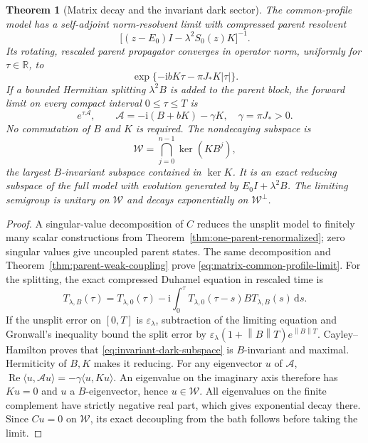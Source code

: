 \documentclass[11pt,a4paper,oneside]{book}
\theoremstyle{plain}
\newtheorem{theorem}{Theorem}[chapter]
\theoremstyle{definition}
\theoremstyle{remark}
\newcommand{\R}{\mathbb R}
\newcommand{\dd}{\mathrm d}
\newcommand{\ii}{\mathrm i}
\newcommand{\norm}[1]{\left\lVert#1\right\rVert}
\newcommand{\src}[2]{\cite{#1}}
\begin{document}
\begin{theorem}[Matrix decay and the invariant dark sector]
\label{thm:matrix-parent-limit}
The common-profile model has a self-adjoint norm-resolvent limit with
compressed parent resolvent
\begin{equation}
 \bigl[(z-E_0)I-\lambda^2S_0(z)K\bigr]^{-1}.
 \label{eq:matrix-parent-resolvent}
\end{equation}
Its rotating, rescaled parent propagator converges in operator norm,
uniformly for $\tau\in\R$, to
\begin{equation}
 \exp\{-\ii bK\tau-\pi J_*K|\tau|\}.
 \label{eq:matrix-common-profile-limit}
\end{equation}
If a bounded Hermitian splitting $\lambda^2B$ is added to the parent
block, the forward limit on every compact interval $0\le\tau\le T$ is
\begin{equation}
 e^{\tau\mathcal A},\qquad
 \mathcal A=-\ii(B+bK)-\gamma K,\quad\gamma=\pi J_*>0.
 \label{eq:split-parent-generator}
\end{equation}
No commutation of $B$ and $K$ is required.  The nondecaying subspace is
\begin{equation}
 \mathcal W=\bigcap_{j=0}^{n-1}\ker(KB^j),
 \label{eq:invariant-dark-subspace}
\end{equation}
the largest $B$-invariant subspace contained in $\ker K$.  It is an
exact reducing subspace of the full model with evolution generated
by $E_0I+\lambda^2B$.  The limiting semigroup is unitary on $\mathcal W$
and decays exponentially on $\mathcal W^\perp$.
\end{theorem}
\begin{proof}
A singular-value decomposition of $C$ reduces the unsplit model to
finitely many scalar constructions from
Theorem~\ref{thm:one-parent-renormalized}; zero singular values give
uncoupled parent states.  The same decomposition and
Theorem~\ref{thm:parent-weak-coupling} prove
\eqref{eq:matrix-common-profile-limit}.  For the splitting, the exact
compressed Duhamel equation in rescaled time is
\[
 T_{\lambda,B}(\tau)=T_{\lambda,0}(\tau)
 -\ii\int_0^\tau T_{\lambda,0}(\tau-s)B T_{\lambda,B}(s)\,\dd s.
\]
If the unsplit error on $[0,T]$ is $\varepsilon_\lambda$, subtraction
of the limiting equation and Gronwall's inequality bound the split
error by $\varepsilon_\lambda(1+\norm B T)e^{\norm B T}$.
Cayley--Hamilton proves that \eqref{eq:invariant-dark-subspace} is
$B$-invariant and maximal.  Hermiticity of $B,K$ makes it reducing.
For any eigenvector $u$ of $\mathcal A$,
$\operatorname{Re}\langle u,\mathcal Au\rangle=-\gamma\langle u,Ku\rangle$.
An eigenvalue on the imaginary axis therefore has $Ku=0$ and $u$ a
$B$-eigenvector, hence $u\in\mathcal W$.  All eigenvalues on the finite
complement have strictly negative real part, which gives exponential
decay there.  Since $Cu=0$ on $\mathcal W$, its exact decoupling from
the bath follows before taking the limit.
\end{proof}
\src{R20}{thm:v20v52-construction,thm:v20v52-limit,thm:v20v53-limit,thm:v20v53-dark}
\end{document}
